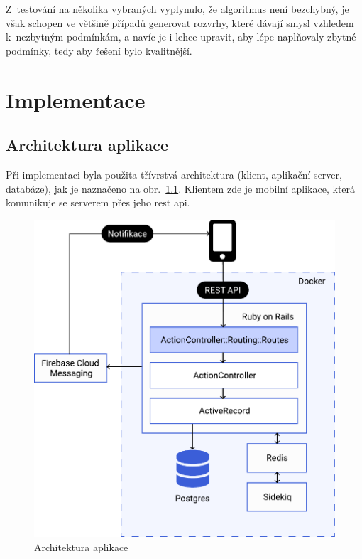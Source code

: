 \documentclass[twoside]{ctuthesis}
\begin{document}
Z~testování na několika vybraných  vyplynulo, že algoritmus není bezchybný, je však schopen ve většině případů generovat rozvrhy, které dávají smysl vzhledem k~nezbytným podmínkám, a navíc je i lehce upravit, aby lépe naplňovaly zbytné podmínky, tedy aby řešení bylo kvalitnější.

\chapter{Implementace}

\section{Architektura aplikace}

Při implementaci byla použita třívrstvá architektura (klient, aplikační server, databáze), jak je naznačeno na obr.~\ref{fig:architecture}. Klientem zde je mobilní aplikace, která komunikuje se serverem přes jeho \acrshort{rest} \acrshort{api}.

\begin{figure}[h]
	\includegraphics[scale=0.7]{img/architecture.pdf}
	\caption{Architektura aplikace}
	\label{fig:architecture}
\end{figure}
\end{document}
